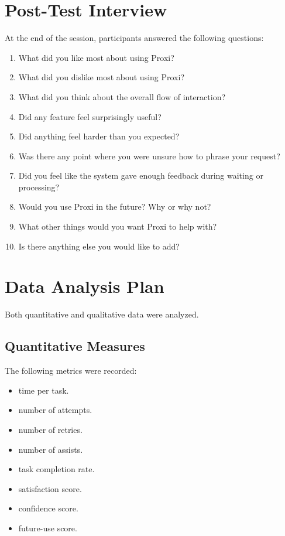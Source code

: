 \documentclass[12pt, titlepage]{article}
\begin{document}
\section{Post-Test Interview}

At the end of the session, participants answered the following
questions:

\begin{enumerate}[label=\arabic*.]
    \item What did you like most about using Proxi?
    \item What did you dislike most about using Proxi?
    \item What did you think about the overall flow of interaction?
    \item Did any feature feel surprisingly useful?
    \item Did anything feel harder than you expected?
    \item Was there any point where you were unsure how to phrase your
    request?
    \item Did you feel like the system gave enough feedback during
    waiting or processing?
    \item Would you use Proxi in the future? Why or why not?
    \item What other things would you want Proxi to help with?
    \item Is there anything else you would like to add?
\end{enumerate}

\section{Data Analysis Plan}

Both quantitative and qualitative data were analyzed.

\subsection{Quantitative Measures}

The following metrics were recorded:
\begin{itemize}
    \item time per task.
    \item number of attempts.
    \item number of retries.
    \item number of assists.
    \item task completion rate.
    \item satisfaction score.
    \item confidence score.
    \item future-use score.
\end{itemize}
\end{document}
